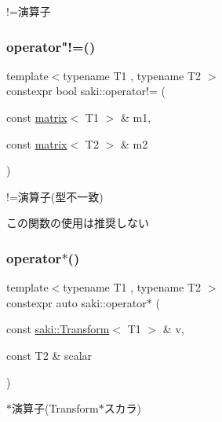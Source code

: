 !=演算子 

\mbox{\label{namespacesaki_a4bef07cf55a40a115c89e6e20406b124}} 
\subsubsection{\texorpdfstring{operator"!=()}{operator!=()}\hspace{0.1cm}{\footnotesize\ttfamily [11/11]}}
{\footnotesize\ttfamily template$<$typename T1 , typename T2 $>$ \\
constexpr bool saki\+::operator!= (\begin{DoxyParamCaption}\item[{const \mbox{\hyperlink{classsaki_1_1matrix}{matrix}}$<$ T1 $>$ \&}]{m1,  }\item[{const \mbox{\hyperlink{classsaki_1_1matrix}{matrix}}$<$ T2 $>$ \&}]{m2 }\end{DoxyParamCaption})}



!=演算子(型不一致) 

この関数の使用は推奨しない \mbox{\label{namespacesaki_a4ccd8e3dbc886bb65d452308a8de0409}} 
\subsubsection{\texorpdfstring{operator$\ast$()}{operator*()}\hspace{0.1cm}{\footnotesize\ttfamily [1/14]}}
{\footnotesize\ttfamily template$<$typename T1 , typename T2 $>$ \\
constexpr auto saki\+::operator$\ast$ (\begin{DoxyParamCaption}\item[{const \mbox{\hyperlink{classsaki_1_1_transform}{saki\+::\+Transform}}$<$ T1 $>$ \&}]{v,  }\item[{const T2 \&}]{scalar }\end{DoxyParamCaption})}



$\ast$演算子(Transform$\ast$スカラ) 

\mbox{\label{namespacesaki_abd9716c5a5ccdc1cafb975df8897acb3}} 
